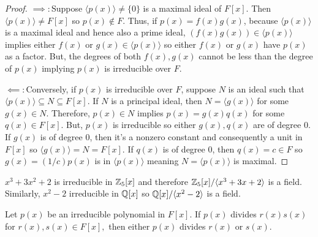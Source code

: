 \begin{proof}
    $\implies\colon$Suppose $\langle p(x) \rangle \neq \{0\}$ is a maximal ideal of $F[x].$ Then $\langle p(x)\rangle \neq F[x]$ so $p(x) \notin F$. Thus, if $p(x) = f(x)g(x)$, because $\langle p(x) \rangle$ is a maximal ideal and hence also a prime ideal, $(f(x)g(x)) \in \langle p(x) \rangle$ implies either $f(x)$ or $g(x) \in \langle p(x) \rangle$ so either $f(x)$ or $g(x)$ have $p(x)$ as a factor. But, the degrees of both $f(x),g(x)$ cannot be less than the degree of $p(x)$ implying $p(x)$ is irreducible over $F$.
    
    $\impliedby\colon$Conversely, if $p(x)$ is irreducible over $F$, suppose $N$ is an ideal such that $\langle p(x) \rangle \subseteq N \subseteq F[x].$ If $N$ is a principal ideal, then $N = \langle g(x)\rangle$ for some $g(x) \in N.$ Therefore, $p(x) \in N$ implies $p(x) = g(x)q(x)$ for some $q(x) \in F[x]$. But, $p(x)$ is irreducible so either $g(x), q(x)$ are of degree 0. If $g(x)$ is of degree 0, then it's a nonzero constant and consequently a unit in $F[x]$ so $\langle g(x) \rangle = N = F[x].$ If $q(x)$ is of degree 0, then $q(x) = c \in F$ so $g(x) = (1/c)p(x)$ is in $\langle p(x) \rangle$ meaning $N = \langle p(x) \rangle$ is maximal.
\end{proof}
\begin{example}
    $x^3 + 3x^2 + 2$ is irreducible in $\mathbb{Z}_5[x]$ and therefore $\mathbb{Z}_5[x]/\langle x^3+3x+2 \rangle$ is a field. Similarly, $x^2 -2$ irreducible in $\mathbb{Q}[x]$ so $\mathbb{Q}[x]/\langle x^2-2\rangle$ is a field.
\end{example}
\begin{theorem}
    Let $p(x)$ be an irreducible polynomial in $F[x]$. If $p(x)$ divides $r(x)s(x)$ for $r(x),s(x) \in F[x],$ then either $p(x)$ divides $r(x)$ or $s(x).$
\end{theorem}

